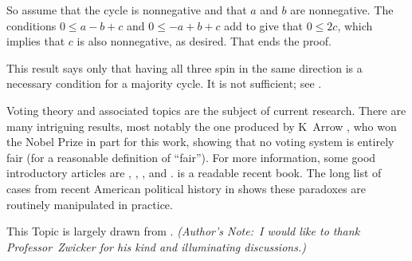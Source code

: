 So assume that the cycle is nonnegative and
that $a$ and $b$ are nonnegative.
The conditions $0\leq a-b+c$ and $0\leq -a+b+c$ add to give
that $0\leq 2c$, which implies that $c$ is also nonnegative, as desired.
That ends the proof.

This result says only that having all three spin in the same direction is a 
necessary condition for a majority cycle.
It is not sufficient; see
.

Voting theory and associated topics are the subject of current research.
There are many intriguing results, most notably 
the one produced by K~Arrow \cite{Arrow}, who won the Nobel Prize in part for
this work, showing that no voting system is entirely fair
(for a reasonable definition of ``fair'').
For more information, some good introductory articles are \cite{Gardner70}, 
\cite{Gardner74}, \cite{Gardner80}, and \cite{NeimiRiker}.
\cite{Taylor} is a readable recent book.
The long list of cases from recent American political history in 
\cite{GamingVote} shows these paradoxes are 
routinely manipulated in practice.
 
This Topic is largely drawn from \cite{Zwicker}.
\emph{(Author's Note:~I would like to thank Professor~Zwicker 
for his kind and illuminating discussions.)}

